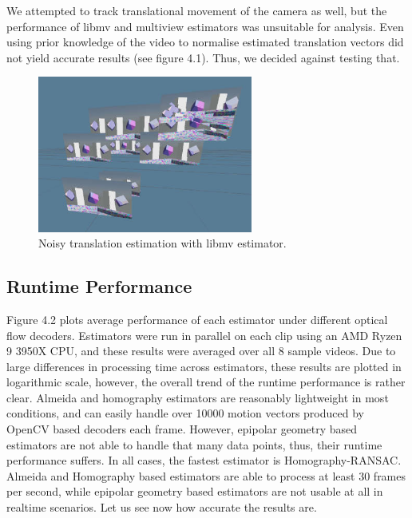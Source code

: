 \documentclass[11pt,english]{report}
\begin{document}
We attempted to track translational movement of the camera as well, but the performance of libmv and multiview estimators was unsuitable for analysis. Even using prior knowledge of the video to normalise estimated translation vectors did not yield accurate results (see figure 4.1). Thus, we decided against testing that.

\begin{figure}[!ht]
	\centering
	\includegraphics[width=200pt]{docs/report/translation.jpg}
	\caption{\centering Noisy translation estimation with libmv estimator.}
\end{figure}

\subsection{Runtime Performance}

Figure 4.2 plots average performance of each estimator under different optical flow decoders. Estimators were run in parallel on each clip using an AMD Ryzen 9 3950X CPU, and these results were averaged over all 8 sample videos. Due to large differences in processing time across estimators, these results are plotted in logarithmic scale, however, the overall trend of the runtime performance is rather clear. Almeida and homography estimators are reasonably lightweight in most conditions, and can easily handle over 10000 motion vectors produced by OpenCV based decoders each frame. However, epipolar geometry based estimators are not able to handle that many data points, thus, their runtime performance suffers. In all cases, the fastest estimator is Homography-RANSAC. Almeida and Homography based estimators are able to process at least 30 frames per second, while epipolar geometry based estimators are not usable at all in realtime scenarios. Let us see now how accurate the results are.
\end{document}
